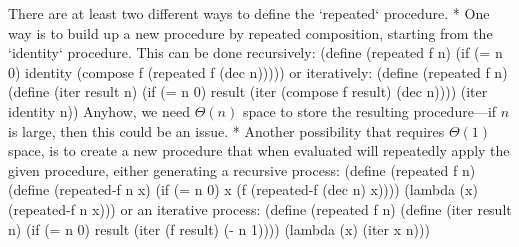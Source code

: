 There are at least two different ways to define the `repeated` procedure.
\begitems
* One way is to build up a new procedure by repeated composition, starting from the `identity` procedure.
This can be done recursively:
\begtt\scm 
(define (repeated f n)
  (if (= n 0)
      identity
      (compose f (repeated f (dec n)))))
\endtt
or iteratively:
\begtt\scm 
(define (repeated f n)
  (define (iter result n)
    (if (= n 0)
        result
        (iter (compose f result) (dec n))))
  (iter identity n))
\endtt
Anyhow, we need $\Theta(n)$ space to store the resulting procedure---if $n$ is large, then this could be an issue.
* Another possibility that requires $\Theta(1)$ space, is to create a new procedure that when evaluated will repeatedly apply the given procedure, either generating a recursive process:
\begtt\scm
(define (repeated f n)
  (define (repeated-f n x)
    (if (= n 0)
        x
        (f (repeated-f (dec n) x))))
  (lambda (x)
    (repeated-f n x)))
\endtt
or an iterative process:
\begtt\scm
(define (repeated f n)
  (define (iter result n)
    (if (= n 0)
        result
        (iter (f result) (- n 1))))
  (lambda (x)
    (iter x n)))
\endtt
\enditems
